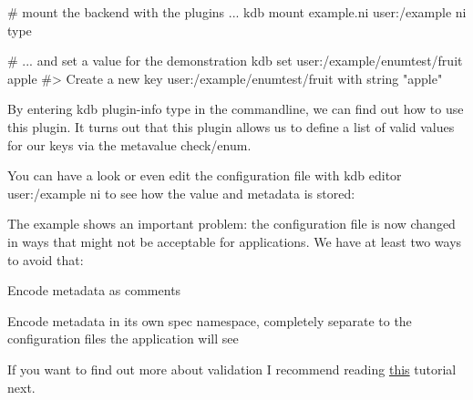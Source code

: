 \begin{DoxyCode}
# mount the backend with the plugins ...
kdb mount example.ni user:/example ni type

# ... and set a value for the demonstration
kdb set user:/example/enumtest/fruit apple
#> Create a new key user:/example/enumtest/fruit with string "apple"
\end{DoxyCode}


By entering {\ttfamily kdb plugin-\/info type} in the commandline, we can find out how to use this plugin. It turns out that this plugin allows us to define a list of valid values for our keys via the metavalue {\ttfamily check/enum}.




You can have a look or even edit the configuration file with {\ttfamily kdb editor user\+:/example ni} to see how the value and metadata is stored\+:




The example shows an important problem\+: the configuration file is now changed in ways that might not be acceptable for applications. We have at least two ways to avoid that\+:


\begin{DoxyEnumerate}
\item Encode metadata as comments
\item Encode metadata in its own {\ttfamily spec} namespace, completely separate to the configuration files the application will see
\end{DoxyEnumerate}

If you want to find out more about validation I recommend reading \hyperlink{doc_tutorials_validation_md}{this} tutorial next.

